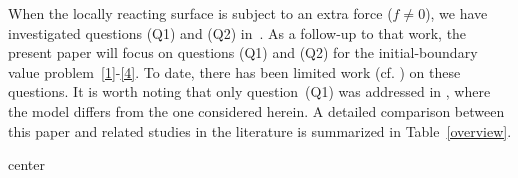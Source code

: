 \documentclass[10pt]{elsarticle}
\begin{document}
When the locally reacting surface is subject to an extra force ($f\neq 0$), we have investigated questions (Q1) and (Q2) in~\cite{jiao2025mixing}. As a follow-up to that work, the present paper will focus on questions (Q1) and (Q2) for the initial-boundary value problem~\eqref{1}-\eqref{4}. To date, there has been limited work (cf. \cite{avalos2003exact}) on these questions. It is worth noting that only question~(Q1) was addressed in \cite{avalos2003exact}, where the model differs from the one considered herein. A detailed comparison between this paper and related studies in the literature is summarized in Table~\ref{overview}.
\begin{table}[htbp]
\begin{adjustbox}{center}
\end{adjustbox}
\end{table}
\end{document}
